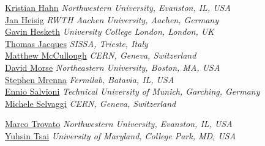 \noindent\href{mailto:kristian.hahn@northwestern.edu}{Kristian Hahn} 
\emph{Northwestern University, Evanston, IL, USA}\\

\noindent\href{mailto:heisig@physik.rwth-aachen.de}{Jan Heisig} 
\emph{RWTH Aachen University, Aachen, Germany}\\

\noindent\href{mailto:gavin.hesketh@ucl.ac.uk}{Gavin Hesketh} 
\emph{University College London, London, UK}\\

\noindent\href{mailto:thomas.jacques@sissa.it}{Thomas Jacques} 
\emph{SISSA, Trieste, Italy}\\

\noindent\href{mailto:matthew.mccullough@cern.ch}{Matthew McCullough} 
\emph{CERN, Geneva, Switzerland}\\

\noindent\href{mailto:david.michael.morse@cern.ch}{David Morse} 
\emph{Northeastern University, Boston, MA, USA}\\

\noindent\href{mailto:mrenna@fnal.gov}{Stephen Mrenna} 
\emph{Fermilab, Batavia, IL, USA}\\

\noindent\href{mailto:ennio.salvioni@tum.de}{Ennio Salvioni} 
\emph{Technical University of Munich, Garching, Germany }\\

\noindent\href{mailto:Michele.Selvaggi@cern.ch}{Michele Selvaggi}
\emph{CERN, Geneva, Switzerland}

\noindent\href{mailto:marco.trovato@northwestern.edu}{Marco Trovato} 
\emph{Northwestern University, Evanston, IL, USA}\\

\noindent\href{mailto:yhtsai@ucdavis.edu}{Yuhsin Tsai} 
\emph{ University of Maryland, College Park, MD, USA}






